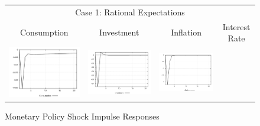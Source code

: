 \begin{figure}
\caption{Monetary Policy Shock Impulse Responses}\label{fg2:irf_mp}
\vspace*{1pc}\hspace*{-0.28in}
\begin{tabular}{cccc}
\multicolumn{4}{c}{Case 1: Rational Expectations}\\
Consumption & Investment & Inflation & Interest Rate \\ 
\includegraphics[scale=0.22]{results_re/Consumption_mpshock_irf.png} & 
\includegraphics[scale=0.22]{results_re/Investment_mpshock_irf.png} & 
\includegraphics[scale=0.22]{results_re/Inflation_mpshock_irf.png} & 

\end{tabular}
\end{figure}
